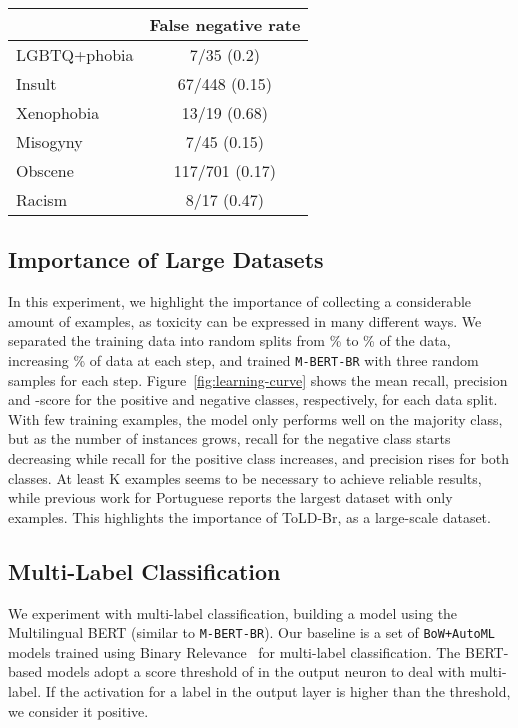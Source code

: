 \documentclass[11pt,a4paper]{article}
\begin{document}
\begin{table}[!ht]
\centering
\begin{tabular}{@{}lc@{}}
\toprule
             & False negative rate \\ \midrule
LGBTQ+phobia & 7/35 (0.2)                                   \\
Insult       & 67/448 (0.15)                                 \\
Xenophobia   & 13/19 (0.68)                                  \\
Misogyny     & 7/45 (0.15)                                   \\
Obscene      & 117/701 (0.17)                                \\
Racism       & 8/17 (0.47)                                   \\ \bottomrule
\end{tabular}
\label{tab:error404}
\end{table}






\subsection{Importance of Large Datasets}
In this experiment, we highlight the importance of collecting a considerable amount of examples, as toxicity can be expressed in many different ways. We separated the training data into  random splits from \% to \% of the data, increasing \% of data at each step, and trained \texttt{M-BERT-BR} with three random samples for each step. Figure~\ref{fig:learning-curve} shows the mean recall, precision and -score for the positive and negative classes, respectively, for each data split. With few training examples, the model only performs well on the majority class, but as the number of instances grows, recall for the negative class starts decreasing while recall for the positive class increases, and precision rises for both classes. At least K examples seems to be necessary to achieve reliable results, while previous work for Portuguese reports the largest dataset with only  examples. This highlights the importance of ToLD-Br, as a large-scale dataset. 


\subsection{Multi-Label Classification}
We experiment with multi-label classification, building a model using the Multilingual BERT (similar to \texttt{M-BERT-BR}). Our baseline is a set of \texttt{BoW+AutoML} models trained using Binary Relevance~\cite{tsoumakas2009mining} for multi-label classification. The BERT-based models adopt a score threshold of  in the output neuron to deal with multi-label. If the activation for a label in the output layer is higher than the threshold, we consider it positive.
\end{document}
